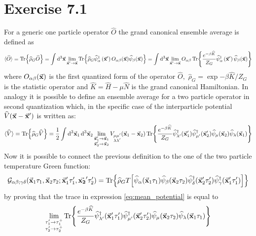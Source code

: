 \documentclass[a4paper]{article}
\newcommand{\meanv}[1]{\langle #1 \rangle}
\renewcommand{\hat}{\widehat}
\begin{document}
\section*{Exercise 7.1}
For a generic one particle operator $\hat{O}$ the grand canonical ensemble average is defined as
\begin{equation}
\meanv{\hat{O}} = \Tr{\hat{\rho}_G \hat{O}} = \int \dd[3]{\va{x}} \lim_{\va{x}'\rightarrow\va{x}}\Tr{\widehat{\rho}_{G} \hat{\psi}_{\alpha}^{\dagger}\left(\va{x}^{\prime}\right) O_{\alpha \beta}(\va{x}) \hat{\psi}_{\beta}(\va{x})}
= \int \dd[3]{\va{x}} \lim_{\va{x}'\rightarrow\va{x}} O_{\alpha\beta}\Tr{\frac{e^{-\beta\hat{K}}}{Z_G}\hat{\psi}_{\alpha}^{\dagger}\left(\va{x}^{\prime}\right)  \hat{\psi}_{\beta}(\va{x}) }
\end{equation}
where $O_{\alpha\beta}(\va{x})$ is the first quantized form of the operator $\hat{O},$ $\hat{\rho}_G = \exp{-\beta\hat{K}}/Z_G$ is the statistic operator and $\hat{K} = \hat{H} - \mu\hat{N}$ is the grand canonical Hamiltonian.
In analogy it is possible to define an ensemble average for a two particle operator in second quantization which, in the specific case of the interparticle potential $\hat{V}(\va{x} - \va{x}')$ is written as:
\begin{equation}
\meanv{\hat{V}} = \Tr{\hat{\rho}_G\hat{V}} = \frac{1}{2}\int\dd[3]{\va{x}_1}\dd[3]{\va{x}_2} \lim_{\substack{\va{x}_1'\rightarrow\va{x}_1\\\va{x}_2'\rightarrow\va{x}_2}} 
V_{\substack{\mu\mu'\\\lambda\lambda'}}(\va{x}_1 - \va{x}_2)
\Tr{\frac{e^{-\beta\hat{K}}}{Z_G}
\hat{\psi}^\dag_{\lambda'}(\va{x}_1')\hat{\psi}^\dag_{\mu'}(\va{x}_2')\hat{\psi}_\mu(\va{x}_2)\hat{\psi}_\lambda(\va{x}_1)}
\label{eq:mean_potential}
\end{equation}
Now it is possible to connect the previous definition to the one of the two particle temperature Green function:
\begin{equation}
\mathcal{G}_{\alpha\beta;\gamma\delta}(\va{x}_1\tau_1,\va{x}_2\tau_2;\va{x}_1'\tau_1',\va{x_2}'\tau_2')
= \Tr{\hat{\rho}_G T\bqty{\hat{\psi}_\alpha(\va{x}_1\tau_1) \hat{\psi}_\beta(\va{x}_2\tau_2)\hat{\psi}_\delta^\dag(\va{x}_2'\tau_2') \hat{\psi}_\gamma^\dag(\va{x}_1'\tau_1')}}
\label{eq:temp_GF}
\end{equation}
by proving that the trace in expression \eqref{eq:mean_potential} is equal to 
\begin{equation}
\lim_{\substack{\tau_1'\rightarrow\tau_1^+\\\tau_2'\rightarrow\tau_2^+}}
\Tr{\frac{e^{-\beta\hat{K}}}{Z_G}
\hat{\psi}_{\lambda'}^\dag(\va{x}_1'\tau_1') \hat{\psi}_{\mu'}^\dag(\va{x}_2'\tau_2')
\hat{\psi}_\mu(\va{x}_2\tau_2) \hat{\psi}_\lambda(\va{x}_1\tau_1)}
\label{eq:time_dep_trace}
\end{equation}
\end{document}
